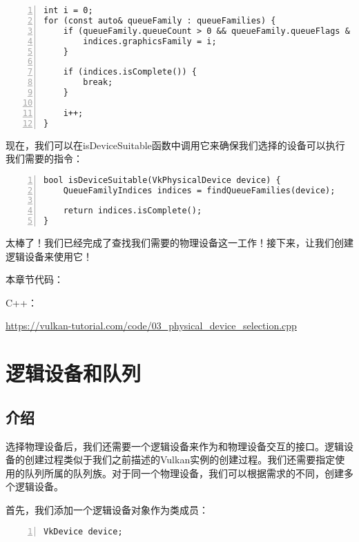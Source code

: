 \documentclass{ctexart}
\begin{document}
\begin{lstlisting}[language={[ANSI]C},keywordstyle=\color{blue!70},commentstyle=\color{red!50!green!50!blue!50},frame=shadowbox, rulesepcolor=\color{red!20!green!20!blue!20},basicstyle=\small,numbers=left, numberstyle=\tiny,breaklines=true]
int i = 0;
for (const auto& queueFamily : queueFamilies) {
	if (queueFamily.queueCount > 0 && queueFamily.queueFlags & VK_QUEUE_GRAPHICS_BIT) {
		indices.graphicsFamily = i;
	}

	if (indices.isComplete()) {
		break;
	}

	i++;
}
\end{lstlisting}

现在，我们可以在isDeviceSuitable函数中调用它来确保我们选择的设备可以执行我们需要的指令：

\begin{lstlisting}[language={[ANSI]C},keywordstyle=\color{blue!70},commentstyle=\color{red!50!green!50!blue!50},frame=shadowbox, rulesepcolor=\color{red!20!green!20!blue!20},basicstyle=\small,numbers=left, numberstyle=\tiny,breaklines=true]
bool isDeviceSuitable(VkPhysicalDevice device) {
	QueueFamilyIndices indices = findQueueFamilies(device);

	return indices.isComplete();
}
\end{lstlisting}

太棒了！我们已经完成了查找我们需要的物理设备这一工作！接下来，让我们创建逻辑设备来使用它！

本章节代码：

C++：

\url{https://vulkan-tutorial.com/code/03_physical_device_selection.cpp}

\newpage
\section{逻辑设备和队列}

\subsection{介绍}

选择物理设备后，我们还需要一个逻辑设备来作为和物理设备交互的接口。逻辑设备的创建过程类似于我们之前描述的Vulkan实例的创建过程。我们还需要指定使用的队列所属的队列族。对于同一个物理设备，我们可以根据需求的不同，创建多个逻辑设备。

首先，我们添加一个逻辑设备对象作为类成员：

\begin{lstlisting}[language={[ANSI]C},keywordstyle=\color{blue!70},commentstyle=\color{red!50!green!50!blue!50},frame=shadowbox, rulesepcolor=\color{red!20!green!20!blue!20},basicstyle=\small,numbers=left, numberstyle=\tiny,breaklines=true]
VkDevice device;
\end{lstlisting}
\end{document}
